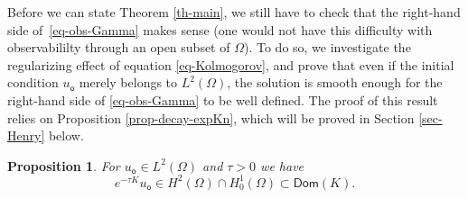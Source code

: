 \documentclass[11pt]{article}
\numberwithin{equation}{section}
\theoremstyle{plain}
\newtheorem{proposition}[theorem]{Proposition}
\theoremstyle{definition}
\newcommand{\1}{\mathds 1}
\newcommand{\Dom}{\mathsf{Dom}}
\let\O\Omega
\newcommand{\uo}{u_{\mathsf{o}}}
\begin{document}
Before we can state Theorem \ref{th-main}, we still have to check that the right-hand side of~\eqref{eq-obs-Gamma} makes sense (one would not have this difficulty with observabililty through an open subset of $\O$).
To do so, we investigate the regularizing effect of equation \eqref{eq-Kolmogorov}, and prove that
even if the initial condition $\uo$ merely belongs to $L^2(\O)$, the solution is smooth enough for the right-hand side
of \eqref{eq-obs-Gamma} to be well defined.
The proof of this result relies on Proposition \ref{prop-decay-expKn}, which will be proved in Section \ref{sec-Henry} below.

\begin{proposition} \label{prop-regularite}
For $\uo \in L^2(\O)$ and $\tau > 0$ we have
\[
e^{-\tau K} \uo \in H^2(\O) \cap H^1_0(\O) \subset \Dom(K).
\]
\end{proposition}
\end{document}
